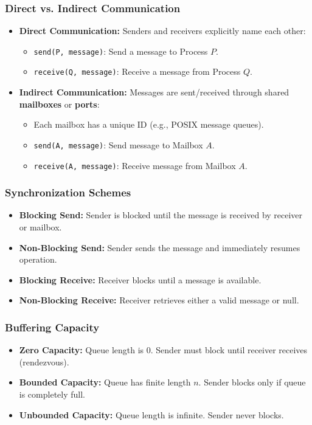 \documentclass[10pt,a4paper]{article}
\begin{document}
\subsubsection{Direct vs. Indirect Communication}
\begin{itemize}
    \item \textbf{Direct Communication:} Senders and receivers explicitly name each other:
    \begin{itemize}
        \item \texttt{send(P, message)}: Send a message to Process $P$.
        \item \texttt{receive(Q, message)}: Receive a message from Process $Q$.
    \end{itemize}
    \item \textbf{Indirect Communication:} Messages are sent/received through shared \textbf{mailboxes} or \textbf{ports}:
    \begin{itemize}
        \item Each mailbox has a unique ID (e.g., POSIX message queues).
        \item \texttt{send(A, message)}: Send message to Mailbox $A$.
        \item \texttt{receive(A, message)}: Receive message from Mailbox $A$.
    \end{itemize}
\end{itemize}

\subsubsection{Synchronization Schemes}
\begin{itemize}
    \item \textbf{Blocking Send:} Sender is blocked until the message is received by receiver or mailbox.
    \item \textbf{Non-Blocking Send:} Sender sends the message and immediately resumes operation.
    \item \textbf{Blocking Receive:} Receiver blocks until a message is available.
    \item \textbf{Non-Blocking Receive:} Receiver retrieves either a valid message or null.
\end{itemize}

\subsubsection{Buffering Capacity}
\begin{itemize}
    \item \textbf{Zero Capacity:} Queue length is 0. Sender must block until receiver receives (rendezvous).
    \item \textbf{Bounded Capacity:} Queue has finite length $n$. Sender blocks only if queue is completely full.
    \item \textbf{Unbounded Capacity:} Queue length is infinite. Sender never blocks.
\end{itemize}
\end{document}
